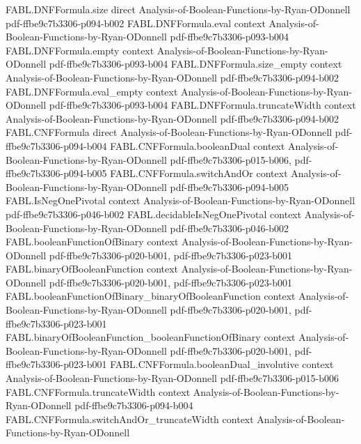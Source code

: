 \begin{theorem}
  {FABL.DNFFormula.size}
  {direct}
  {Analysis-of-Boolean-Functions-by-Ryan-ODonnell}
  {pdf-ffbe9c7b3306-p094-b002}
\proofstep
  {FABL.DNFFormula.eval}
  {context}
  {Analysis-of-Boolean-Functions-by-Ryan-ODonnell}
  {pdf-ffbe9c7b3306-p093-b004}
\proofstep
  {FABL.DNFFormula.empty}
  {context}
  {Analysis-of-Boolean-Functions-by-Ryan-ODonnell}
  {pdf-ffbe9c7b3306-p093-b004}
\proofstep
  {FABL.DNFFormula.size_empty}
  {context}
  {Analysis-of-Boolean-Functions-by-Ryan-ODonnell}
  {pdf-ffbe9c7b3306-p094-b002}
\proofstep
  {FABL.DNFFormula.eval_empty}
  {context}
  {Analysis-of-Boolean-Functions-by-Ryan-ODonnell}
  {pdf-ffbe9c7b3306-p093-b004}
\proofstep
  {FABL.DNFFormula.truncateWidth}
  {context}
  {Analysis-of-Boolean-Functions-by-Ryan-ODonnell}
  {pdf-ffbe9c7b3306-p094-b002}
\proofstep
  {FABL.CNFFormula}
  {direct}
  {Analysis-of-Boolean-Functions-by-Ryan-ODonnell}
  {pdf-ffbe9c7b3306-p094-b004}
\proofstep
  {FABL.CNFFormula.booleanDual}
  {context}
  {Analysis-of-Boolean-Functions-by-Ryan-ODonnell}
  {pdf-ffbe9c7b3306-p015-b006,
    pdf-ffbe9c7b3306-p094-b005}
\proofstep
  {FABL.CNFFormula.switchAndOr}
  {context}
  {Analysis-of-Boolean-Functions-by-Ryan-ODonnell}
  {pdf-ffbe9c7b3306-p094-b005}
\proofstep
  {FABL.IsNegOnePivotal}
  {context}
  {Analysis-of-Boolean-Functions-by-Ryan-ODonnell}
  {pdf-ffbe9c7b3306-p046-b002}
\proofstep
  {FABL.decidableIsNegOnePivotal}
  {context}
  {Analysis-of-Boolean-Functions-by-Ryan-ODonnell}
  {pdf-ffbe9c7b3306-p046-b002}
\proofstep
  {FABL.booleanFunctionOfBinary}
  {context}
  {Analysis-of-Boolean-Functions-by-Ryan-ODonnell}
  {pdf-ffbe9c7b3306-p020-b001,
    pdf-ffbe9c7b3306-p023-b001}
\proofstep
  {FABL.binaryOfBooleanFunction}
  {context}
  {Analysis-of-Boolean-Functions-by-Ryan-ODonnell}
  {pdf-ffbe9c7b3306-p020-b001,
    pdf-ffbe9c7b3306-p023-b001}
\proofstep
  {FABL.booleanFunctionOfBinary_binaryOfBooleanFunction}
  {context}
  {Analysis-of-Boolean-Functions-by-Ryan-ODonnell}
  {pdf-ffbe9c7b3306-p020-b001,
    pdf-ffbe9c7b3306-p023-b001}
\proofstep
  {FABL.binaryOfBooleanFunction_booleanFunctionOfBinary}
  {context}
  {Analysis-of-Boolean-Functions-by-Ryan-ODonnell}
  {pdf-ffbe9c7b3306-p020-b001,
    pdf-ffbe9c7b3306-p023-b001}
\proofstep
  {FABL.CNFFormula.booleanDual_involutive}
  {context}
  {Analysis-of-Boolean-Functions-by-Ryan-ODonnell}
  {pdf-ffbe9c7b3306-p015-b006}
\proofstep
  {FABL.CNFFormula.truncateWidth}
  {context}
  {Analysis-of-Boolean-Functions-by-Ryan-ODonnell}
  {pdf-ffbe9c7b3306-p094-b004}
\proofstep
  {FABL.CNFFormula.switchAndOr_truncateWidth}
  {context}
  {Analysis-of-Boolean-Functions-by-Ryan-ODonnell}

\end{theorem}

